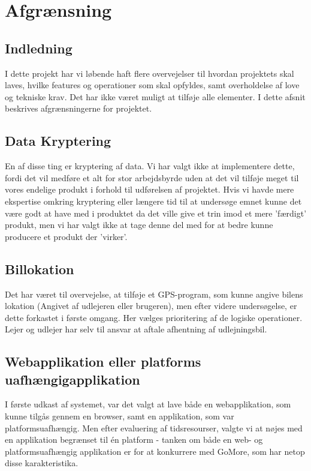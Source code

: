\documentclass[Rapport/Rapport_main.tex]{subfiles}
\begin{document}
\section{Afgrænsning}
\subsection*{Indledning}
I dette projekt har vi løbende haft flere overvejelser til hvordan projektets skal laves, hvilke features og operationer som skal opfyldes, samt overholdelse af love og tekniske krav. Det har ikke været muligt at tilføje alle elementer. I dette afsnit beskrives afgrænsningerne for projektet.

\subsection{Data Kryptering}
En af disse ting er kryptering af data. Vi har valgt ikke at implementere dette, fordi det vil medføre et alt for stor arbejdsbyrde uden at det vil tilføje meget til vores endelige produkt i forhold til udførelsen af projektet. Hvis vi havde mere ekspertise omkring kryptering eller længere tid til at undersøge emnet kunne det være godt at have med i produktet da det ville give et trin imod et mere 'færdigt' produkt, men vi har valgt ikke at tage denne del med for at bedre kunne producere et produkt der 'virker'. 

\subsection{Billokation}
Det har været til overvejelse, at tilføje et GPS-program, som kunne angive bilens lokation (Angivet af udlejeren eller brugeren), men efter videre undersøgelse, er dette forkastet i første omgang. Her vælges prioritering af de logiske operationer. Lejer og udlejer har selv til ansvar at aftale afhentning af udlejningsbil. 

\subsection{Webapplikation eller platforms uafhængigapplikation}
I første udkast af systemet, var det valgt at lave både en webapplikation, som kunne tilgås gennem en browser, samt en applikation, som var platformsuafhængig. Men efter evaluering af tidsresourser, valgte vi at nøjes med en applikation begrænset til én platform - tanken om både en web- og platformsuafhængig applikation er for at konkurrere med GoMore, som har netop disse karakteristika.
\end{document}
